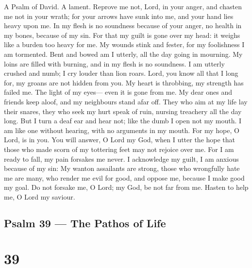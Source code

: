 A Psalm of David. A lament.  Reprove me not, Lord, in your
anger, and chasten me not in your wrath;  for your arrows
have sunk into me, and your hand lies heavy upon me.  In my
flesh is no soundness because of your anger, no health in my bones,
because of my sin.  For that my guilt is gone over my head:
it weighs like a burden too heavy for me.  My wounds stink
and fester, for my foolishness I am tormented.  Bent and
bowed am I utterly, all the day going in mourning.  My loins
are filled with burning, and in my flesh is no soundness.  I
am utterly crushed and numb; I cry louder than lion roars. 
Lord, you know all that I long for, my groans are not hidden from you.
 My heart is throbbing, my strength has failed me. The
light of my eyes--- even it is gone from me.  My dear ones
and friends keep aloof, and my neighbours stand afar off. 
They who aim at my life lay their snares, they who seek my hurt speak of
ruin, nursing treachery all the day long.  But I turn a
deaf ear and hear not; like the dumb I open not my mouth. 
I am like one without hearing, with no arguments in my mouth.
 For my hope, O Lord, is in you. You will answer, O Lord my
God,  when I utter the hope that those who made scorn of my
tottering feet may not rejoice over me.  For I am ready to
fall, my pain forsakes me never.  I acknowledge my guilt, I
am anxious because of my sin:  My wanton assailants are
strong, those who wrongfully hate me are many,  who render
me evil for good, and oppose me, because I make good my goal.
 Do not forsake me, O Lord; my God, be not far from me.
 Hasten to help me, O Lord my saviour.

\hypertarget{psalm-39-the-pathos-of-life}{%
\subsection{Psalm 39 --- The Pathos of
Life}\label{psalm-39-the-pathos-of-life}}

\hypertarget{section-38}{%
\section{39}\label{section-38}}

